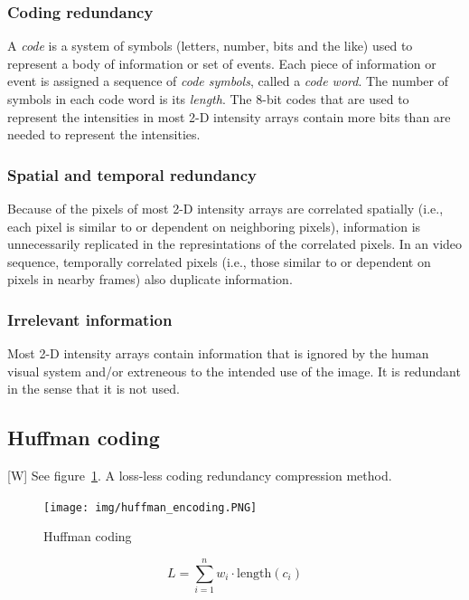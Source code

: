 \documentclass[12pt]{article}
\begin{document}
        \subsubsection{Coding redundancy}
            A \emph{code} is a system of symbols (letters, number, bits and the like) used to
            represent a body of information or set of events. Each piece of information or 
            event is assigned a sequence of \emph{code symbols}, called a \emph{code word}.
            The number of symbols in each code word is its \emph{length}. The 8-bit codes that 
            are used to represent the intensities in most 2-D intensity arrays contain more
            bits than are needed to represent the intensities.
        \subsubsection{Spatial and temporal redundancy} 
            Because of the pixels of most 2-D intensity arrays are correlated spatially (i.e.,
            each pixel is similar to or dependent on neighboring pixels), information is
            unnecessarily replicated in the represintations of the correlated pixels. In an
            video sequence, temporally correlated pixels (i.e., those similar to or dependent
            on pixels in nearby frames) also duplicate information.
        \subsubsection{Irrelevant information} 
            Most 2-D intensity arrays contain information that is ignored by the human visual
            system and/or extreneous to the intended use of the image. It is redundant in the
            sense that it is not used.
    \subsection{Huffman coding}
        [W] See figure~\ref{fig:huffman}. A loss-less coding redundancy compression method.
        \begin{figure}[h!]
        \centering
        \texttt{[image: img/huffman\_encoding.PNG]}
        \caption{Huffman coding}
        \label{fig:huffman}
        \end{figure}
        \begin{equation}
            L = \sum_{i=1}^n w_i \cdot \mathrm{length}(c_i)
        \end{equation}
\end{document}
